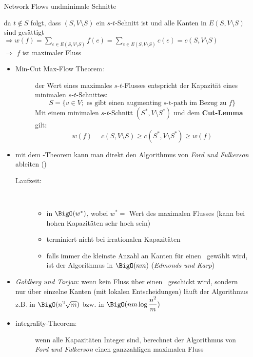 \begin{TOPbreak}{Network Flows und}{minimale Schnitte}
\begin{itemize}
\begin{description}
\begin{description}
					da $t \notin S$ folgt, dass $(S,V\setminus S)$ ein $s$-$t$-Schnitt ist und alle Kanten in $E(S,V\setminus S)$ sind gesättigt\\
					$\Rightarrow w(f) = \sum\limits_{e\in E(S,V\setminus S)} f(e) = \sum\limits_{e\in E(S,V\setminus S)} c(e) = c(S,V\setminus S)$\\
					$\Rightarrow $ $f$ ist maximaler Fluss 
				\end{description}
			\end{description}
	\end{itemize}
	\topbreak
	\vspace*{-1.5\baselineskip}\begin{itemize}
		\item \begin{description}
				\item[Min-Cut Max-Flow Theorem:] der Wert eines maximales $s$-$t$-Flusses entspricht der Kapazität eines minimalen $s$-$t$-Schnittes:
				\[S=\{v \in V; \text{ es gibt einen augmenting s-t-path im Bezug zu }f\}\]
				Mit einem minimalen $s$-$t$-Schnitt $(S^{*}, V\setminus S^{*})$ und dem \textbf{Cut-Lemma} gilt:
				\[w(f) = c(S,V\setminus S) \geq c(S^{*}, V\setminus S^{*}) \geq w(f)\]
			\end{description}
		\item mit dem \aug-Theorem kann man direkt den Algorithmus von \textit{Ford und Fulkerson} ableiten () %
			\begin{description}
				\item[Laufzeit:]\ \\\up
					\begin{itemize}
						\item in $\BigO(w^{*})$, wobei $w^{*}=$ Wert des maximalen Flusses (kann bei hohen Kapazitäten sehr hoch sein)
						\item terminiert nicht bei irrationalen Kapazitäten
						\item falls immer die kleinste Anzahl an Kanten für einen \aug~gewählt wird, ist der Algorithmus in $\BigO(nm)$ (\textit{Edmonds und Karp})
					\end{itemize}
			\end{description}
		\item \textit{Goldberg und Tarjan}: wenn kein Fluss über einen \aug~geschickt wird, sondern nur über einzelne Kanten (mit lokalen Entscheidungen) läuft der Algorithmus z.B. in $\BigO(n^2\sqrt{m})$ bzw. in $\BigO(nm\log \dfrac{n^2}{m})$
		\item \begin{description}
			\item[integrality-Theorem:] wenn alle Kapazitäten Integer sind, berechnet der Algorithmus von \textit{Ford und Fulkerson} einen ganzzahligen maximalen Fluss
		\end{description}
	\end{itemize}
\end{TOPbreak}